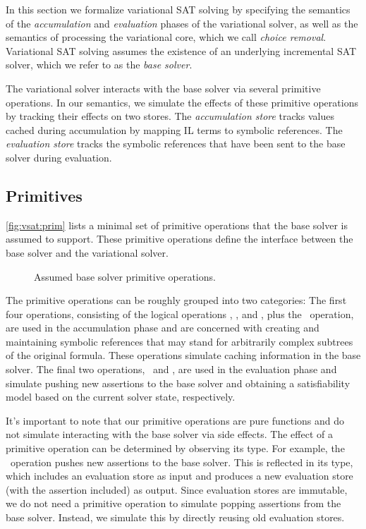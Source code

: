 \label{section:vsat:formalization}
%
In this section we formalize variational SAT solving by specifying the
semantics of the \emph{accumulation} and \emph{evaluation} phases of the
variational solver, as well as the semantics of processing the variational
core, which we call \emph{choice removal}.
%
Variational SAT solving assumes the existence of an underlying incremental SAT
solver, which we refer to as the \emph{base solver}.


The variational solver interacts with the base solver via several primitive
operations. In our semantics, we simulate the effects of these primitive
operations by tracking their effects on two stores.
%
The \emph{accumulation store} \aStore{} tracks values cached during
accumulation by mapping IL terms to symbolic references. The \emph{evaluation
store} \eStore{} tracks the symbolic references that have been sent to the base
solver during evaluation.

\subsection{Primitives}
%
\autoref{fig:vsat:prim} lists a minimal set of primitive operations that
the base solver is assumed to support. These primitive operations define the
interface between the base solver and the variational solver.


\begin{figure}
  
  \caption{Assumed base solver primitive operations.}%
  \label{fig:vsat:prim}
\end{figure}


The primitive operations can be roughly grouped into two categories:
%
The first four operations, consisting of the logical operations \pnot, \pand,
and \por, plus the \pspawn\ operation, are used in the accumulation phase and
are concerned with creating and maintaining symbolic references that may stand
for arbitrarily complex subtrees of the original formula. These operations
simulate caching information in the base solver.
%
The final two operations, \passert\ and \pmodel, are used in the evaluation
phase and simulate pushing new assertions to the base solver and obtaining a
satisfiability model based on the current solver state, respectively.


It's important to note that our primitive operations are pure functions and do
not simulate interacting with the base solver via side effects. The effect of a
primitive operation can be determined by observing its type. For example, the
\passert\ operation pushes new assertions to the base solver. This is reflected
in its type, which includes an evaluation store as input and produces a new
evaluation store (with the assertion included) as output.
%
Since evaluation stores are immutable, we do not need a primitive operation to
simulate popping assertions from the base solver. Instead, we simulate this by
directly reusing old evaluation stores.


